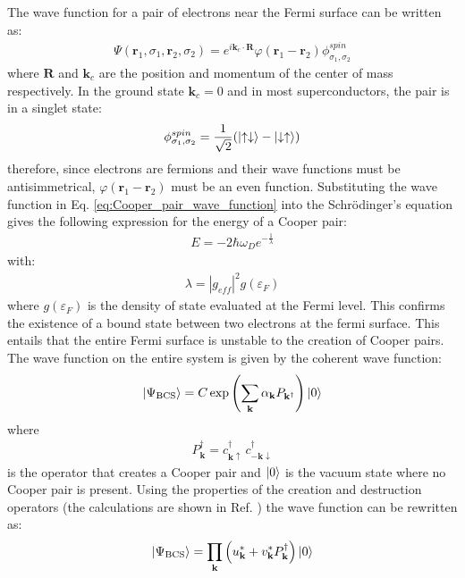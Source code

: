 \documentclass[12pt,a4paper,oneside,openany]{book}
\begin{document}
The wave function for a pair of electrons near the Fermi surface can be written as:
\begin{align*}
	\Psi (\mathbf{r}_1, \sigma_1, \mathbf{r}_2, \sigma_2) = e^{i \mathbf{k}_c \cdot \mathbf{R}} \varphi (\mathbf{r}_1 - \mathbf{r}_2) \phi^{spin}_{\sigma_1, \sigma_2}
	\label{eq:Cooper_pair_wave_function}
\end{align*} 
where $\mathbf{R}$ and $\mathbf{k}_c$ are the position and momentum of the center of mass respectively. In the ground state $\mathbf{k}_c = 0$ and in most superconductors, the pair is in a singlet state: 
\begin{align*}
	\phi^{spin}_{\sigma_1, \sigma_2} = \dfrac{1}{\sqrt{2}} (\ket{\uparrow \downarrow} - \ket{\downarrow \uparrow})
\end{align*}
therefore, since electrons are fermions and their wave functions must be antisimmetrical, $ \varphi (\mathbf{r}_1 - \mathbf{r}_2)$ must be an even function. Substituting the wave function in Eq. \eqref{eq:Cooper_pair_wave_function} into the Schrödinger's equation gives the following expression for the energy of a Cooper pair:
\begin{align}
	E = - 2 \hbar \omega_D e^{-\frac{1}{\lambda}}
\end{align}
with:
\begin{align*}
	\lambda = |g_{eff}|^2 g(\varepsilon_F)
\end{align*}
where $g(\varepsilon_F)$ is the density of state evaluated at the Fermi level. This confirms the existence of a bound state between two electrons at the fermi surface. This entails that the entire Fermi surface is unstable to the creation of Cooper pairs. The wave function on the entire system is given by the coherent wave function:
\begin{align*}
	\ket{\Psi_{\text{BCS}}} = C \, \text{exp} \left( \sum_{\mathbf{k}} \alpha_{\mathbf{k}} P_{\mathbf{k}^{\dagger}} \right) \ket{0}
\end{align*} 
where
\begin{align}
	P_{\mathbf{k}}^{\dagger} = c_{\mathbf{k} \uparrow}^{\dagger} \, c_{\mathbf{-k} \downarrow}^{\dagger}
\end{align}
is the operator that creates a Cooper pair and $\ket{0}$ is the vacuum state where no Cooper pair is present. Using the properties of the creation and destruction operators (the calculations are shown in Ref. \cite{Annet}) the wave function can be rewritten as:
\begin{align}
	\ket{\Psi_{\text{BCS}}} = \prod_{\mathbf{k}} \left( u_{\mathbf{k}}^* + v_{\mathbf{k}}^* P_{\mathbf{k}}^{\dagger}\right) \ket{0}
\end{align}
\end{document}
